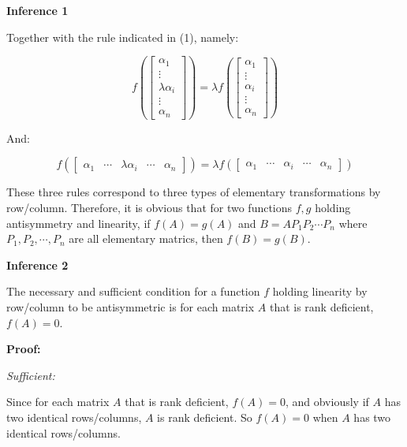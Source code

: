 \documentclass{article}
\begin{document}
\vspace{2mm}
\textbf{Inference 1}

Together with the rule indicated in (1), namely:

\begin{equation}
f(\begin{bmatrix}
    \alpha_1 \\
    \vdots \\
    \lambda\alpha_i \\
    \vdots \\
    \alpha_n
\end{bmatrix})=
\lambda f(\begin{bmatrix}
    \alpha_1 \\
    \vdots \\
    \alpha_i \\
    \vdots \\
    \alpha_n
\end{bmatrix})
\end{equation}

And:

\begin{equation}
f(\begin{bmatrix}
    \alpha_1 &
    \cdots &
    \lambda\alpha_i &
    \cdots &
    \alpha_n
\end{bmatrix})=
\lambda f(\begin{bmatrix}
    \alpha_1 &
    \cdots &
    \alpha_i &
    \cdots &
    \alpha_n
\end{bmatrix})
\end{equation}

These three rules correspond to three types of elementary transformations
by row/column. Therefore, it is obvious that for two functions \(f,g\) holding
antisymmetry and linearity, if \(f(A)=g(A)\) and \(B=AP_1P_2\cdots P_n\)
where \(P_1, P_2, \cdots, P_n\) are all elementary matrics, then
\(f(B)=g(B)\).

\vspace{2mm}
\textbf{Inference 2}

The necessary and sufficient condition for a function \(f\) holding
linearity by row/column to be antisymmetric is for each matrix
\(A\) that is rank deficient, \(f(A)=0\).

\vspace{2mm}
\textbf{Proof:}

\vspace{1mm}
\textit{Sufficient:}

Since for each matrix \(A\) that is rank deficient, \(f(A)=0\),
and obviously if \(A\) has two identical rows/columns, \(A\) is
rank deficient. So \(f(A)=0\) when \(A\) has two identical rows/columns.
\end{document}
